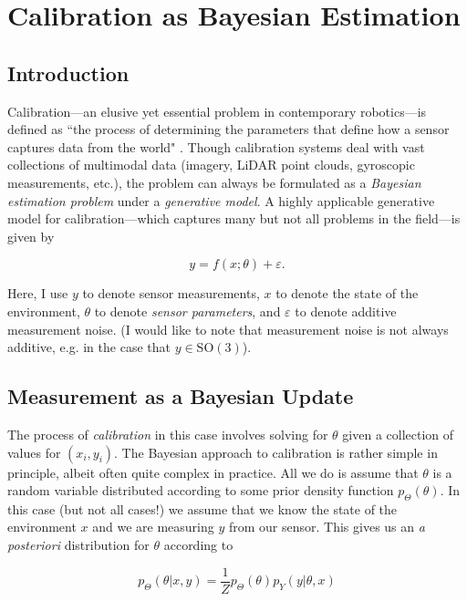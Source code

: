 \documentclass[conference]{IEEEtran}
\begin{document}
\section{Calibration as Bayesian Estimation}

\subsection{Introduction}

Calibration---an elusive yet essential problem in contemporary robotics---is defined as ``the process of determining the parameters that define how a sensor captures data from the world" \cite{tangram}.  Though calibration systems deal with vast collections of multimodal data (imagery, LiDAR point clouds, gyroscopic measurements, etc.), the problem can always be formulated as a \textit{Bayesian estimation problem} under a \textit{generative model}.  A highly applicable generative model for calibration---which captures many but not all problems in the field---is given by

\begin{equation}
	y = f(x; \theta) + \varepsilon.
	\label{eq:genmodel}
\end{equation}

Here, I use \( y \) to denote sensor measurements, \( x \) to denote the state of the environment, \( \theta \) to denote \textit{sensor parameters}, and \( \varepsilon \) to denote additive measurement noise.  (I would like to note that measurement noise is not always additive, e.g. in the case that \( y \in \mathrm{SO(3)} \)).

\subsection{Measurement as a Bayesian Update}

The process of \textit{calibration} in this case involves solving for \( \theta \) given a collection of values for \( (x_i, y_i) \).  The Bayesian approach to calibration is rather simple in principle, albeit often quite complex in practice.  All we do is assume that \( \theta \) is a random variable distributed according to some prior density function \( p_\Theta(\theta) \).  In this case (but not all cases!) we assume that we know the state of the environment \( x \) and we are measuring \( y \) from our sensor.  This gives us an \textit{a posteriori} distribution for \( \theta \) according to

\begin{equation}
	p_\Theta(\theta | x, y) = \frac1Z p_\Theta(\theta) p_Y(y | \theta, x)
\end{equation}
\end{document}
